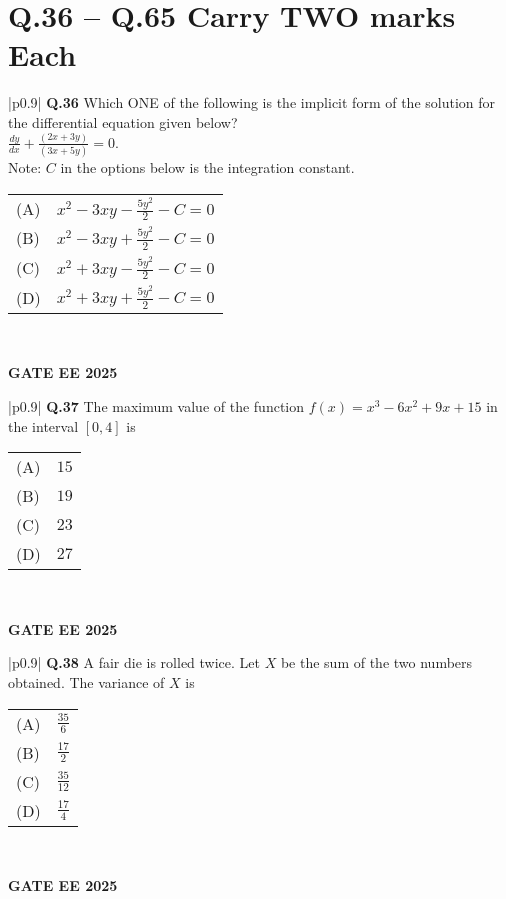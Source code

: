 \documentclass{article}
\begin{document}
\section*{Q.36 – Q.65 Carry TWO marks Each}

\begin{table}[h]
\centering
\begin{tabular}{|p{0.9\linewidth}|}
\hline
\textbf{Q.36} Which ONE of the following is the implicit form of the solution for the differential equation given below? \\
$\frac{dy}{dx} + \frac{(2x+3y)}{(3x+5y)} = 0$. \\
Note: $C$ in the options below is the integration constant. \\
\hline
\begin{tabular}{ll}
(A) & $x^2 - 3xy - \frac{5y^2}{2} - C = 0$ \\
(B) & $x^2 - 3xy + \frac{5y^2}{2} - C = 0$ \\
(C) & $x^2 + 3xy - \frac{5y^2}{2} - C = 0$ \\
(D) & $x^2 + 3xy + \frac{5y^2}{2} - C = 0$ \\
\end{tabular} \\
\hline
\end{tabular}
\end{table}
\textbf{GATE EE 2025}

\begin{table}[h]
\centering
\begin{tabular}{|p{0.9\linewidth}|}
\hline
\textbf{Q.37} The maximum value of the function $f(x) = x^3 - 6x^2 + 9x + 15$ in the interval $[0, 4]$ is \\
\hline
\begin{tabular}{ll}
(A) & $15$ \\
(B) & $19$ \\
(C) & $23$ \\
(D) & $27$ \\
\end{tabular} \\
\hline
\end{tabular}
\end{table}
\textbf{GATE EE 2025}

\begin{table}[h]
\centering
\begin{tabular}{|p{0.9\linewidth}|}
\hline
\textbf{Q.38} A fair die is rolled twice. Let $X$ be the sum of the two numbers obtained. The variance of $X$ is \\
\hline
\begin{tabular}{ll}
(A) & $\frac{35}{6}$ \\
(B) & $\frac{17}{2}$ \\
(C) & $\frac{35}{12}$ \\
(D) & $\frac{17}{4}$ \\
\end{tabular} \\
\hline
\end{tabular}
\end{table}
\textbf{GATE EE 2025}
\end{document}
